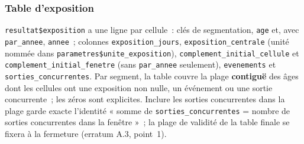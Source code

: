 \documentclass[a4paper,11pt]{article}
\newcommand{\code}[1]{\texttt{\small #1}}
\begin{document}
\subsubsection*{Table d'exposition}

{\sloppy{} \code{resultat\$exposition} a une ligne par cellule~: clés de segmentation,
\code{age} et, avec \code{par\_annee}, \code{annee}~; colonnes
\code{exposition\_jours}, \code{exposition\_centrale} (unité nommée dans
\code{parametres\$unite\_exposition}), \code{complement\_initial\_cellule} et
\code{complement\_initial\_fenetre} (sans \code{par\_annee} seulement),
\code{evenements} et \code{sorties\_concurrentes}. Par segment, la table couvre
la plage \textbf{contiguë} des âges dont les cellules ont une exposition
non nulle, un événement ou une sortie concurrente~; les zéros sont explicites.
Inclure les sorties concurrentes dans la plage garde exacte l'identité
« somme de \code{sorties\_concurrentes} = nombre de sorties concurrentes dans
la fenêtre »~; la plage de validité de la table finale se fixera à la
fermeture (erratum A.3, point~1).\par}
\end{document}
